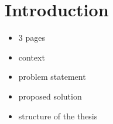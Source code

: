\section{Introduction}
\label{sec:introduction}

\begin{itemize} 
    \item 3 pages
    \item context
    \item problem statement
    \item proposed solution
    \item structure of the thesis 
\end{itemize}